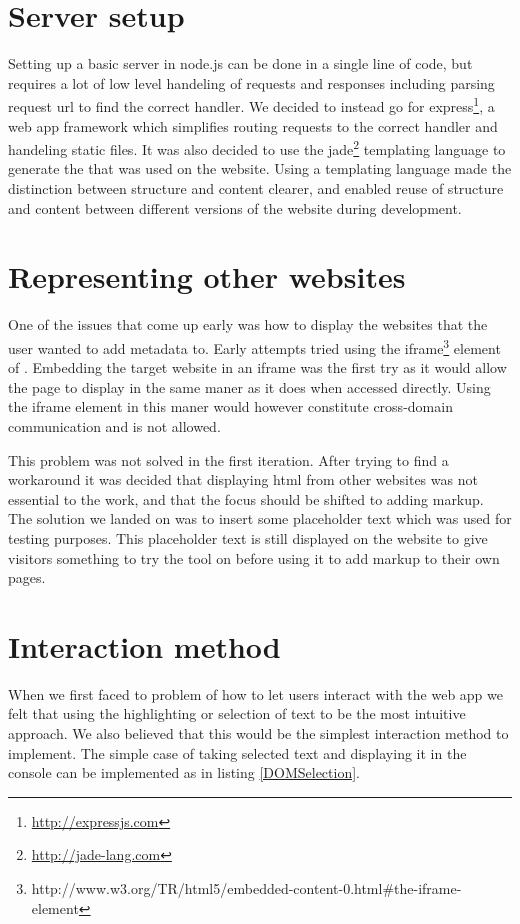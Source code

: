 \section{Server setup}
Setting up a basic server in node.js can be done in a single line of code,
but requires a lot of low level handeling of requests and responses
including parsing request url to find the correct handler.
We decided to instead go for express\footnote{\url{http://expressjs.com}},
a web app framework which simplifies routing requests to the correct handler and handeling static files.
It was also decided to use the jade\footnote{\url{http://jade-lang.com}}
templating language to generate the  that was used on the website.
Using a templating language made the distinction between structure and content clearer,
and enabled reuse of structure and content between different versions of the website during development.


\section{Representing other websites}
One of the issues that come up early was how to display the websites that the user wanted to add metadata to.
Early attempts tried using the iframe\footnote{http://www.w3.org/TR/html5/embedded-content-0.html\#the-iframe-element}
element of .
Embedding the target website in an iframe was the first try as it would allow the page to display in the same maner
as it does when accessed directly.
Using the iframe element in this maner would however constitute cross-domain communication and is not allowed.

This problem was not solved in the first iteration.
After trying to find a workaround it was decided that displaying html from other websites was not essential to the work,
and that the focus should be shifted to adding markup.
The solution we landed on was to insert some placeholder text which was used for testing purposes.
This placeholder text is still displayed on the website to give visitors something to try the tool on before using it
to add markup to their own pages.

\section{Interaction method}
When we first faced to problem of how to let users interact with the web app we felt that using the highlighting or
selection of text to be the most intuitive approach.
We also believed that this would be the simplest interaction method to implement.
The simple case of taking selected text and displaying it in the console can be implemented as in listing \ref{DOMSelection}.

